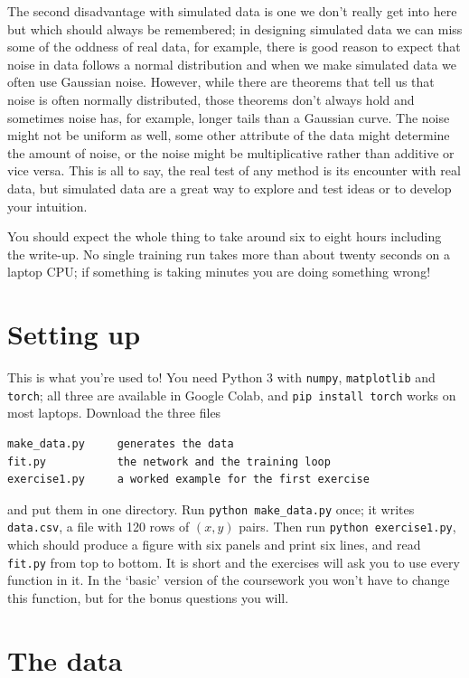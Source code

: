 \documentclass[11pt,a4paper]{article}
\newcounter{exercise}
\begin{document}
The second disadvantage with simulated data is one we don't really get
into here but which should always be remembered; in designing
simulated data we can miss some of the oddness of real data, for
example, there is good reason to expect that noise in data follows a
normal distribution and when we make simulated data we often use
Gaussian noise. However, while there are theorems that tell us that
noise is often normally distributed, those theorems don't always hold
and sometimes noise has, for example, longer tails than a Gaussian
curve. The noise might not be uniform as well, some other attribute of
the data might determine the amount of noise, or the noise might be
multiplicative rather than additive or vice versa. This is all to say,
the real test of any method is its encounter with real data, but
simulated data are a great way to explore and test ideas or to develop
your intuition.

You should expect the whole thing to take around six to eight hours
including the write-up. No single training run takes more than about
twenty seconds on a laptop CPU; if something is taking minutes you are
doing something wrong!

\section*{Setting up}

This is what you're used to! You need Python 3 with \texttt{numpy}, \texttt{matplotlib} and \texttt{torch}; all three are available in Google Colab, and \texttt{pip install torch} works on most laptops. Download the three files
\begin{lstlisting}
make_data.py     generates the data
fit.py           the network and the training loop
exercise1.py     a worked example for the first exercise
\end{lstlisting}
and put them in one directory. Run \texttt{python make\_data.py} once;
it writes \texttt{data.csv}, a file with 120 rows of $(x, y)$
pairs. Then run \texttt{python exercise1.py}, which should produce a
figure with six panels and print six lines, and read \texttt{fit.py}
from top to bottom. It is short and the exercises will ask you to use
every function in it. In the `basic' version of the coursework you
won't have to change this function, but for the bonus questions you
will.

\section*{The data}
\end{document}
